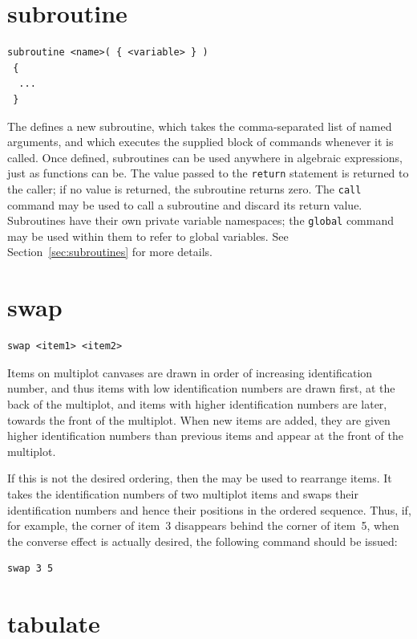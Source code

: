 \section{subroutine}

\begin{verbatim}
subroutine <name>( { <variable> } )
 {
  ...
 }
\end{verbatim}

The  defines a new subroutine, which takes the
comma-separated list of named arguments, and which executes the supplied block
of commands whenever it is called. Once defined, subroutines can be used
anywhere in algebraic expressions, just as functions can be. The value passed
to the {\tt return} statement is returned to the caller; if no value is
returned, the subroutine returns zero. The {\tt call} command may be used to
call a subroutine and discard its return value. Subroutines have their own
private variable namespaces; the {\tt global} command may be used within them
to refer to global variables. See Section~\ref{sec:subroutines} for more
details.


\section{swap}

\begin{verbatim}
swap <item1> <item2>
\end{verbatim}

Items on multiplot canvases are drawn in order of increasing identification
number, and thus items with low identification numbers are drawn first, at the
back of the multiplot, and items with higher identification numbers are later,
towards the front of the multiplot. When new items are added, they are given
higher identification numbers than previous items and appear at the front of
the multiplot.

If this is not the desired ordering, then the  may be used to
rearrange items. It takes the identification numbers of two multiplot items and
swaps their identification numbers and hence their positions in the ordered
sequence.  Thus, if, for example, the corner of item~3 disappears behind the
corner of item~5, when the converse effect is actually desired, the following
command should be issued:
\begin{verbatim}
swap 3 5
\end{verbatim}


\section{tabulate}

